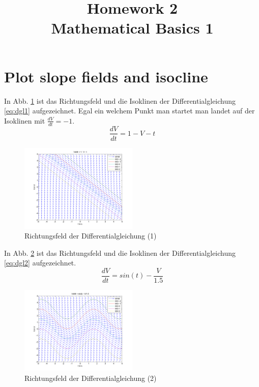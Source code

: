 \documentclass[conference]{IEEEtran}
\begin{document}
%
%
\title{Homework 2\\ Mathematical Basics 1}

\author{
}


\maketitle

\IEEEpeerreviewmaketitle

\section{Plot slope fields and isocline}
In Abb. \ref{fig:fkt1} ist das Richtungsfeld und die Isoklinen der Differentialgleichung \ref{eq:dgl1} aufgezeichnet. Egal ein welchem Punkt man startet man landet auf der Isoklinen mit $\frac{dV}{dt}=-1$.
\begin{equation}
	\frac{dV}{dt} = 1 - V - t
	\label{eq:dgl1}
\end{equation}
\begin{figure}
	\centering
	\includegraphics[width=0.5\textwidth]{img/fkt1.png}
	\caption{Richtungsfeld der Differentialgleichung (1)}
	\label{fig:fkt1}
\end{figure}

In Abb. \ref{fig:fkt2} ist das Richtungsfeld und die Isoklinen der Differentialgleichung \ref{eq:dgl2} aufgezeichnet. 
\begin{equation}
	\frac{dV}{dt} = sin(t) - \frac{V}{1.5}
	\label{eq:dgl2}
\end{equation}
\begin{figure}
	\centering
	\includegraphics[width=0.5\textwidth]{img/fkt2.png}
	\caption{Richtungsfeld der Differentialgleichung (2)}
	\label{fig:fkt2}
\end{figure}
\end{document}
